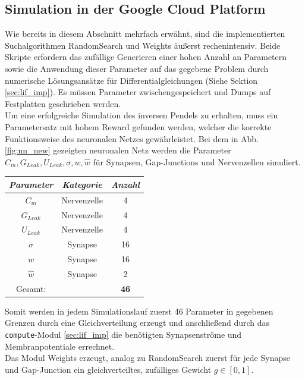 	\subsection{Simulation in der Google Cloud Platform\textsuperscript{\textregistered}}
		Wie bereits in diesem Abschnitt mehrfach erwähnt, sind die implementierten Suchalgorithmen RandomSearch und Weights äußerst rechenintensiv. Beide Skripte erfordern das zufällige Generieren einer hohen Anzahl an Parametern sowie die Anwendung dieser Parameter auf das gegebene Problem durch numerische Lösungsansätze für Differentialgleichungen (Siehe Sektion \ref{sec:lif_imp}). Es müssen Parameter zwischengespeichert und Dumps auf Festplatten geschrieben werden.\\
		Um eine erfolgreiche Simulation des inversen Pendels zu erhalten, muss ein Parametersatz mit hohem Reward gefunden werden, welcher die korrekte Funktionsweise des neuronalen Netzes gewährleistet. Bei dem in Abb. \ref{fig:nn_new} gezeigten neuronalen Netz werden die Parameter $C_m, G_{Leak}, U_{Leak}, \sigma, w, \hat{w}$ für Synapsen, Gap-Junctions und Nervenzellen simuliert.
		\begin{center}
			\begin{tabular}{c@{\hskip 0.5cm}c@{\hskip 0.5cm}c@{\hskip 0.5cm}}    \toprule
				\setlength{\tabcolsep}{50pt}
				\renewcommand{\arraystretch}{1.5}
				\emph{Parameter}	& \emph{Kategorie}  & \emph{Anzahl} \\\midrule
				$C_m$				& Nervenzelle		& 4				\\ 
				$G_{Leak}$	 		& Nervenzelle		& 4				\\
				$U_{Leak}$	 		& Nervenzelle		& 4				\\
				$\sigma$			& Synapse			& 16			\\
				$w$					& Synapse			& 16			\\ 
				$\hat{w}$			& Synapse			& 2				\\\bottomrule
				Gesamt:				&					& \textbf{46}	\\
				\hline
			\end{tabular}
		\end{center}
		Somit werden in jedem Simulationslauf zuerst 46 Parameter in gegebenen Grenzen durch eine Gleichverteilung erzeugt und anschließend durch das \texttt{compute}-Modul \ref{sec:lif_imp} die benötigten Synapsenströme und Membranpotentiale errechnet.\\
		Das Modul Weights erzeugt, analog zu RandomSearch zuerst für jede Synapse und Gap-Junction ein gleichverteiltes, zufälliges Gewicht $g\in[0,1]$.
